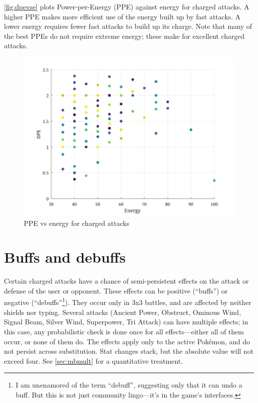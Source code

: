 \autoref{fig:dpevse} plots Power-per-Energy (PPE) against energy for charged attacks.
A higher PPE makes more efficient use of the energy built up by fast attacks.
A lower energy requires fewer fast attacks to build up its charge.
Note that many of the best PPEs do not require extreme energy; these make
 for excellent charged attacks.

\begin{figure}[ht]
\includegraphics[keepaspectratio,width=\textwidth]{octave/dpevse.png}
  \caption{PPE vs energy for charged attacks\label{fig:dpevse}}
\end{figure}

\section{Buffs and debuffs\label{sec:buffs}}
Certain charged attacks have a chance of semi-persistent effects on the
  attack or defense of the user or opponent.
These effects can be positive (``buffs'') or negative (``debuffs''\footnote{I am unenamored of the term ``debuff'',
  suggesting only that it can undo a buff. But this is not just community lingo---it's in the
  game's interfaces.}).
They occur only in 3x3 battles, and are affected by neither shields nor typing.
Several attacks (Ancient Power, Obstruct, Ominous Wind, Signal Beam, Silver
  Wind, Superpower, Tri Attack) can have multiple effects; in this case, any
  probabilistic check is done once for all effects---either all of them
  occur, or none of them do.
The effects apply only to the active Pokémon, and do not persist across substitution.
Stat changes stack, but the absolute value will not exceed four.
See \autoref{sec:mbmult} for a quantitative treatment.

